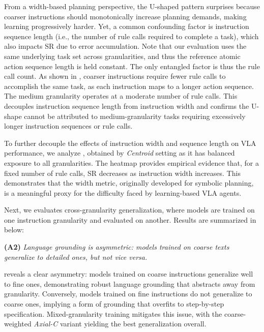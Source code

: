 \documentclass{article}
\begin{document}
From a width-based planning perspective, the U-shaped pattern surprises because coarser instructions should monotonically increase planning demands, making learning progressively harder. Yet, a common confounding factor is instruction sequence length (i.e., the number of rule calls required to complete a task), which also impacts SR due to error accumulation. Note that our evaluation uses the same underlying task set across granularities, and thus the reference atomic action sequence length is held constant. The only entangled factor is thus the rule call count. As shown in , coarser instructions require fewer rule calls to accomplish the same task, as each instruction maps to a longer action sequence. The medium granularity operates at a moderate number of rule calls. This decouples instruction sequence length from instruction width and confirms the U-shape cannot be attributed to medium-granularity tasks requiring excessively longer instruction sequences or rule calls.

To further decouple the effects of instruction width and sequence length on VLA performance, we analyze , obtained by \emph{Centroid} setting as it has balanced exposure to all granularities. The heatmap provides empirical evidence that, for a fixed number of rule calls, SR decreases as instruction width increases. This demonstrates that the width metric, originally developed for symbolic planning, is a meaningful proxy for the difficulty faced by learning-based VLA agents.

Next, we evaluates cross-granularity generalization, where models are trained on one instruction granularity and evaluated on another. Results are summarized in below:

\textbf{(A2)} \emph{Language grounding is asymmetric: models trained on coarse texts generalize to detailed ones, but not vice versa.}

 reveals a clear asymmetry: models trained on coarse instructions generalize well to fine ones, demonstrating robust language grounding that abstracts away from granularity. Conversely, models trained on fine instructions do not generalize to coarse ones, implying a form of grounding that overfits to step-by-step specification. Mixed-granularity training mitigates this issue, with the coarse-weighted \emph{Axial-C} variant yielding the best generalization overall.
\end{document}
